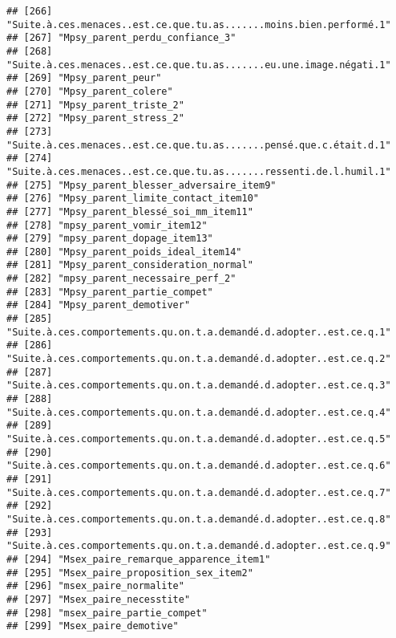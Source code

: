 \documentclass[
]{article}
\begin{document}
\begin{verbatim}
## [266] "Suite.à.ces.menaces..est.ce.que.tu.as.......moins.bien.performé.1" 
## [267] "Mpsy_parent_perdu_confiance_3"                                     
## [268] "Suite.à.ces.menaces..est.ce.que.tu.as.......eu.une.image.négati.1" 
## [269] "Mpsy_parent_peur"                                                  
## [270] "Mpsy_parent_colere"                                                
## [271] "Mpsy_parent_triste_2"                                              
## [272] "Mpsy_parent_stress_2"                                              
## [273] "Suite.à.ces.menaces..est.ce.que.tu.as.......pensé.que.c.était.d.1" 
## [274] "Suite.à.ces.menaces..est.ce.que.tu.as.......ressenti.de.l.humil.1" 
## [275] "Mpsy_parent_blesser_adversaire_item9"                              
## [276] "Mpsy_parent_limite_contact_item10"                                 
## [277] "Mpsy_parent_blessé_soi_mm_item11"                                  
## [278] "mpsy_parent_vomir_item12"                                          
## [279] "mpsy_parent_dopage_item13"                                         
## [280] "Mpsy_parent_poids_ideal_item14"                                    
## [281] "Mpsy_parent_consideration_normal"                                  
## [282] "mpsy_parent_necessaire_perf_2"                                     
## [283] "Mpsy_parent_partie_compet"                                         
## [284] "Mpsy_parent_demotiver"                                             
## [285] "Suite.à.ces.comportements.qu.on.t.a.demandé.d.adopter..est.ce.q.1" 
## [286] "Suite.à.ces.comportements.qu.on.t.a.demandé.d.adopter..est.ce.q.2" 
## [287] "Suite.à.ces.comportements.qu.on.t.a.demandé.d.adopter..est.ce.q.3" 
## [288] "Suite.à.ces.comportements.qu.on.t.a.demandé.d.adopter..est.ce.q.4" 
## [289] "Suite.à.ces.comportements.qu.on.t.a.demandé.d.adopter..est.ce.q.5" 
## [290] "Suite.à.ces.comportements.qu.on.t.a.demandé.d.adopter..est.ce.q.6" 
## [291] "Suite.à.ces.comportements.qu.on.t.a.demandé.d.adopter..est.ce.q.7" 
## [292] "Suite.à.ces.comportements.qu.on.t.a.demandé.d.adopter..est.ce.q.8" 
## [293] "Suite.à.ces.comportements.qu.on.t.a.demandé.d.adopter..est.ce.q.9" 
## [294] "Msex_paire_remarque_apparence_item1"                               
## [295] "Msex_paire_proposition_sex_item2"                                  
## [296] "msex_paire_normalite"                                              
## [297] "Msex_paire_necesstite"                                             
## [298] "msex_paire_partie_compet"                                          
## [299] "Msex_paire_demotive"                                               

\end{verbatim}
\end{document}
